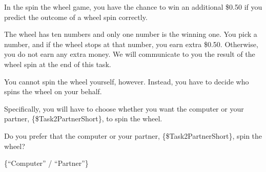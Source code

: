\begin{description}[listparindent = 1.5em]
    \item[Spin the wheel game:] \hspace{1cm}
    
In the spin the wheel game, you have the chance to win an additional
    \$0.50 if you predict the outcome of a wheel spin correctly.  
      
    The wheel has ten
    numbers and only one number is the winning one. You pick a number, and if
    the wheel stops at that number, you earn extra \$0.50. Otherwise, you do not
    earn any extra money. We will communicate to you the result of the wheel
    spin at the end of this task. 
    
    You cannot spin the wheel yourself, however.
    Instead, you have to decide who spins the wheel on your behalf. 
    
    Specifically,
    you will have to choose whether you want the computer or your partner,
    \{\$Task2PartnerShort\}, to spin the wheel. 
    
    Do you prefer that the computer or
    your partner, \{\$Task2PartnerShort\}, spin the wheel? 
    
    \{``Computer'' /
    ``Partner''\}
\end{description}


